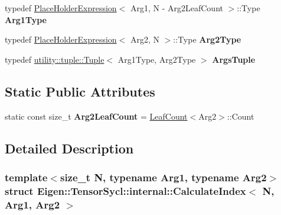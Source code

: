 \begin{DoxyCompactItemize}
typedef \hyperlink{struct_eigen_1_1_tensor_sycl_1_1internal_1_1_place_holder_expression}{Place\+Holder\+Expression}$<$ Arg1, N -\/ Arg2\+Leaf\+Count $>$\+::Type {\bfseries Arg1\+Type}
\item 
\mbox{\label{struct_eigen_1_1_tensor_sycl_1_1internal_1_1_calculate_index_3_01_n_00_01_arg1_00_01_arg2_01_4_a6c055f3af77c9a09fb2fe8093b99a1a5}} 
typedef \hyperlink{struct_eigen_1_1_tensor_sycl_1_1internal_1_1_place_holder_expression}{Place\+Holder\+Expression}$<$ Arg2, N $>$\+::Type {\bfseries Arg2\+Type}
\item 
\mbox{\label{struct_eigen_1_1_tensor_sycl_1_1internal_1_1_calculate_index_3_01_n_00_01_arg1_00_01_arg2_01_4_ac40017c48fed1f4b9a3338c43cbc46c7}} 
typedef \hyperlink{structutility_1_1tuple_1_1_tuple}{utility\+::tuple\+::\+Tuple}$<$ Arg1\+Type, Arg2\+Type $>$ {\bfseries Args\+Tuple}
\end{DoxyCompactItemize}
\subsection*{Static Public Attributes}
\begin{DoxyCompactItemize}
\item 
\mbox{\label{struct_eigen_1_1_tensor_sycl_1_1internal_1_1_calculate_index_3_01_n_00_01_arg1_00_01_arg2_01_4_a66339712e7bd9e82a4ae28e78d0b4c3d}} 
static const size\+\_\+t {\bfseries Arg2\+Leaf\+Count} = \hyperlink{struct_eigen_1_1_tensor_sycl_1_1internal_1_1_leaf_count}{Leaf\+Count}$<$Arg2$>$\+::Count
\end{DoxyCompactItemize}


\subsection{Detailed Description}
\subsubsection*{template$<$size\+\_\+t N, typename Arg1, typename Arg2$>$\newline
struct Eigen\+::\+Tensor\+Sycl\+::internal\+::\+Calculate\+Index$<$ N, Arg1, Arg2 $>$}



